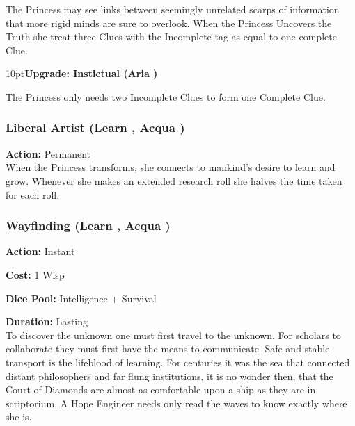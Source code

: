 \noindent The Princess may see links between seemingly unrelated scarps of information that more rigid minds are sure to overlook. When the Princess Uncovers the Truth she treat three Clues with the Incomplete tag as equal to one complete Clue. 

\begin{myindentpar}{10pt}\textbf{Upgrade: Instictual (Aria \textbullet\textbullet\textbullet\textbullet)}

The Princess only needs two Incomplete Clues to form one Complete Clue. 

\end{myindentpar}

\subsubsection*{Liberal Artist (Learn \textbullet, Acqua \textbullet)}

\noindent \textbf{Action:} Permanent \\

\noindent When the Princess transforms, she connects to mankind's desire to learn and grow. Whenever she makes an extended research roll she halves the time taken for each roll.

\subsubsection*{Wayfinding (Learn \textbullet, Acqua \textbullet\textbullet)}

\noindent \textbf{Action:} Instant 

\noindent \textbf{Cost:} 1 Wisp

\noindent \textbf{Dice Pool:} Intelligence + Survival

\noindent \textbf{Duration:} Lasting \\

\noindent To discover the unknown one must first travel to the unknown. For scholars to collaborate they must first have the means to communicate. Safe and stable transport is the lifeblood of learning. For centuries it was the sea that connected distant philosophers and far flung institutions, it is no wonder then, that the Court of Diamonds are almost as comfortable upon a ship as they are in scriptorium. A Hope Engineer needs only read the waves to know exactly where she is. 

